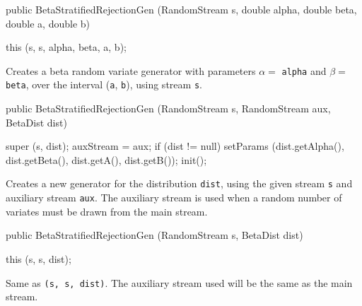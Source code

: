 \begin{code}

   public BetaStratifiedRejectionGen (RandomStream s,
          double alpha, double beta, double a, double b) \begin{hide} {
      this (s, s, alpha, beta, a, b);
   }\end{hide}
\end{code} 
\begin{tabb} Creates a beta random variate generator with parameters $\alpha =$ 
 \texttt{alpha} and $\beta =$ \texttt{beta},  over the interval
 (\texttt{a}, \texttt{b}), using stream \texttt{s}.
\end{tabb}
\begin{code}

   public BetaStratifiedRejectionGen (RandomStream s, RandomStream aux, 
                                      BetaDist dist) \begin{hide} {
      super (s, dist);
      auxStream = aux;
      if (dist != null)
         setParams (dist.getAlpha(), dist.getBeta(), dist.getA(), dist.getB());
      init();
   }\end{hide}
\end{code}
  \begin{tabb}  Creates a new generator for the distribution \texttt{dist},
     using the given stream \texttt{s} and auxiliary stream \texttt{aux}.
     The auxiliary stream is used when a random number
     of variates must be drawn from the main stream.
  \end{tabb}
\begin{code}

   public BetaStratifiedRejectionGen (RandomStream s, BetaDist dist)\begin{hide} {
      this (s, s, dist);
   }\end{hide}
\end{code}
  \begin{tabb}  
    Same as \texttt{(s, s, dist)}.
    The auxiliary stream used will be the same as the main stream.
  \end{tabb}

